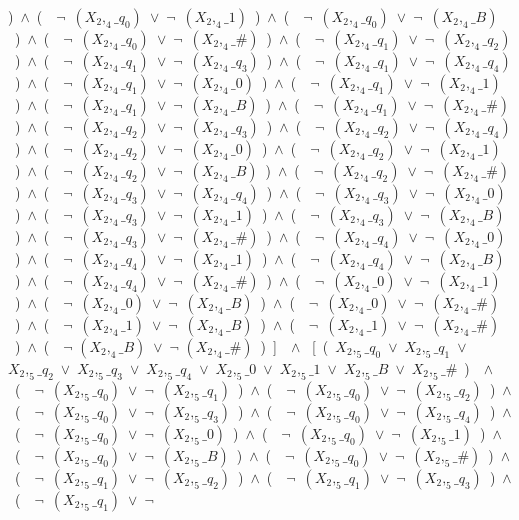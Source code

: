 ﻿\documentclass[a4paper,10pt]{article}
\begin{document}
)\ $\wedge$\ (\ \ $\neg$\ $(X_2,_4\_q_0)$\ $\vee$\ $\neg$\ $(X_2,_4\_1)$\ )\ $\wedge$\ (\ \ $\neg$\ $(X_2,_4\_q_0)$\ $\vee$\ $\neg$\ $(X_2,_4\_B)$\ )\ $\wedge$\ (\ \ $\neg$\ $(X_2,_4\_q_0)$\ $\vee$\ $\neg$\ $(X_2,_4\_\#)$\ )\ $\wedge$\ (\ \ $\neg$\ $(X_2,_4\_q_1)$\ $\vee$\ $\neg$\ $(X_2,_4\_q_2)$\ )\ $\wedge$\ (\ \ $\neg$\ $(X_2,_4\_q_1)$\ $\vee$\ $\neg$\ $(X_2,_4\_q_3)$\ )\ $\wedge$\ (\ \ $\neg$\ $(X_2,_4\_q_1)$\ $\vee$\ $\neg$\ $(X_2,_4\_q_4)$\ )\ $\wedge$\ (\ \ $\neg$\ $(X_2,_4\_q_1)$\ $\vee$\ $\neg$\ $(X_2,_4\_0)$\ )\ $\wedge$\ (\ \ $\neg$\ $(X_2,_4\_q_1)$\ $\vee$\ $\neg$\ $(X_2,_4\_1)$\ )\ $\wedge$\ (\ \ $\neg$\ $(X_2,_4\_q_1)$\ $\vee$\ $\neg$\ $(X_2,_4\_B)$\ )\ $\wedge$\ (\ \ $\neg$\ $(X_2,_4\_q_1)$\ $\vee$\ $\neg$\ $(X_2,_4\_\#)$\ )\ $\wedge$\ (\ \ $\neg$\ $(X_2,_4\_q_2)$\ $\vee$\ $\neg$\ $(X_2,_4\_q_3)$\ )\ $\wedge$\ (\ \ $\neg$\ $(X_2,_4\_q_2)$\ $\vee$\ $\neg$\ $(X_2,_4\_q_4)$\ )\ $\wedge$\ (\ \ $\neg$\ $(X_2,_4\_q_2)$\ $\vee$\ $\neg$\ $(X_2,_4\_0)$\ )\ $\wedge$\ (\ \ $\neg$\ $(X_2,_4\_q_2)$\ $\vee$\ $\neg$\ $(X_2,_4\_1)$\ )\ $\wedge$\ (\ \ $\neg$\ $(X_2,_4\_q_2)$\ $\vee$\ $\neg$\ $(X_2,_4\_B)$\ )\ $\wedge$\ (\ \ $\neg$\ $(X_2,_4\_q_2)$\ $\vee$\ $\neg$\ $(X_2,_4\_\#)$\ )\ $\wedge$\ (\ \ $\neg$\ $(X_2,_4\_q_3)$\ $\vee$\ $\neg$\ $(X_2,_4\_q_4)$\ )\ $\wedge$\ (\ \ $\neg$\ $(X_2,_4\_q_3)$\ $\vee$\ $\neg$\ $(X_2,_4\_0)$\ )\ $\wedge$\ (\ \ $\neg$\ $(X_2,_4\_q_3)$\ $\vee$\ $\neg$\ $(X_2,_4\_1)$\ )\ $\wedge$\ (\ \ $\neg$\ $(X_2,_4\_q_3)$\ $\vee$\ $\neg$\ $(X_2,_4\_B)$\ )\ $\wedge$\ (\ \ $\neg$\ $(X_2,_4\_q_3)$\ $\vee$\ $\neg$\ $(X_2,_4\_\#)$\ )\ $\wedge$\ (\ \ $\neg$\ $(X_2,_4\_q_4)$\ $\vee$\ $\neg$\ $(X_2,_4\_0)$\ )\ $\wedge$\ (\ \ $\neg$\ $(X_2,_4\_q_4)$\ $\vee$\ $\neg$\ $(X_2,_4\_1)$\ )\ $\wedge$\ (\ \ $\neg$\ $(X_2,_4\_q_4)$\ $\vee$\ $\neg$\ $(X_2,_4\_B)$\ )\ $\wedge$\ (\ \ $\neg$\ $(X_2,_4\_q_4)$\ $\vee$\ $\neg$\ $(X_2,_4\_\#)$\ )\ $\wedge$\ (\ \ $\neg$\ $(X_2,_4\_0)$\ $\vee$\ $\neg$\ $(X_2,_4\_1)$\ )\ $\wedge$\ (\ \ $\neg$\ $(X_2,_4\_0)$\ $\vee$\ $\neg$\ $(X_2,_4\_B)$\ )\ $\wedge$\ (\ \ $\neg$\ $(X_2,_4\_0)$\ $\vee$\ $\neg$\ $(X_2,_4\_\#)$\ )\ $\wedge$\ (\ \ $\neg$\ $(X_2,_4\_1)$\ $\vee$\ $\neg$\ $(X_2,_4\_B)$\ )\ $\wedge$\ (\ \ $\neg$\ $(X_2,_4\_1)$\ $\vee$\ $\neg$\ $(X_2,_4\_\#)$\ )\ $\wedge$\ (\ \ $\neg$ $(X_2,_4\_B)$\ $\vee$\ $\neg$ $(X_2,_4\_\#)$\ )\ ]\ \ $\wedge$ \ [\ (\ $X_2,_5\_q_0$\ $\vee$\ $X_2,_5\_q_1$\ $\vee$\ $X_2,_5\_q_2$\ $\vee$\ $X_2,_5\_q_3$\ $\vee$\ $X_2,_5\_q_4$\ $\vee$\ $X_2,_5\_0$\ $\vee$\ $X_2,_5\_1$\ $\vee$\ $X_2,_5\_B$\ $\vee$\ $X_2,_5\_\#$\ )\ \ $\wedge$ \ (\ \ $\neg$\ $(X_2,_5\_q_0)$\ $\vee$\ $\neg$\ $(X_2,_5\_q_1)$\ )\ $\wedge$\ (\ \ $\neg$\ $(X_2,_5\_q_0)$\ $\vee$\ $\neg$\ $(X_2,_5\_q_2)$\ )\ $\wedge$\ (\ \ $\neg$\ $(X_2,_5\_q_0)$\ $\vee$\ $\neg$\ $(X_2,_5\_q_3)$\ )\ $\wedge$\ (\ \ $\neg$\ $(X_2,_5\_q_0)$\ $\vee$\ $\neg$\ $(X_2,_5\_q_4)$\ )\ $\wedge$\ (\ \ $\neg$\ $(X_2,_5\_q_0)$\ $\vee$\ $\neg$\ $(X_2,_5\_0)$\ )\ $\wedge$\ (\ \ $\neg$\ $(X_2,_5\_q_0)$\ $\vee$\ $\neg$\ $(X_2,_5\_1)$\ )\ $\wedge$\ (\ \ $\neg$\ $(X_2,_5\_q_0)$\ $\vee$\ $\neg$\ $(X_2,_5\_B)$\ )\ $\wedge$\ (\ \ $\neg$\ $(X_2,_5\_q_0)$\ $\vee$\ $\neg$\ $(X_2,_5\_\#)$\ )\ $\wedge$\ (\ \ $\neg$\ $(X_2,_5\_q_1)$\ $\vee$\ $\neg$\ $(X_2,_5\_q_2)$\ )\ $\wedge$\ (\ \ $\neg$\ $(X_2,_5\_q_1)$\ $\vee$\ $\neg$\ $(X_2,_5\_q_3)$\ )\ $\wedge$\ (\ \ $\neg$\ $(X_2,_5\_q_1)$\ $\vee$\ $\neg$\ 
\end{document}
